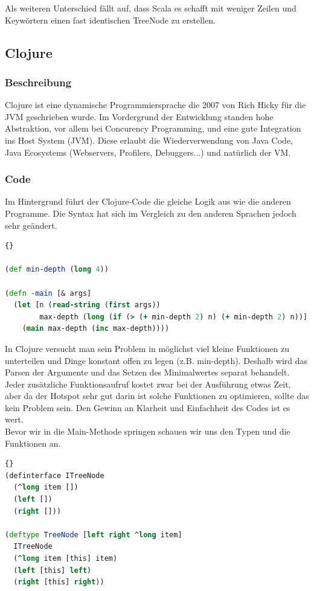 \documentclass{fancydocument}
\begin{document}
Als weiteren Unterschied f\"allt auf, dass Scala es schafft mit weniger
Zeilen und Keywörtern einen fast identischen TreeNode zu
erstellen.

\subsection{Clojure}
\subsubsection{Beschreibung}

Clojure ist eine dynamische Programmiersprache die 2007 von Rich Hicky
für die JVM geschrieben wurde. Im Vordergrund der Entwicklung standen
hohe Abstraktion, vor allem bei Concurency Programming, und eine gute
Integration ins Host System (JVM). Diese erlaubt die Wiederverwendung von
Java Code, Java Ecosystems (Webservers, Profilers, Debuggers...) und natürlich der VM.
\newpage
\subsubsection{Code}
Im Hintergrund f\"uhrt der Clojure-Code die gleiche Logik aus wie die anderen
Programme. Die Syntax hat sich im Vergleich zu den anderen Sprachen jedoch
sehr ge\"andert. 
\begin{lstlisting}[language=Clojure,caption=Simple main]{}

(def min-depth (long 4))

(defn -main [& args]
  (let [n (read-string (first args))
        max-depth (long (if (> (+ min-depth 2) n) (+ min-depth 2) n))]
    (main max-depth (inc max-depth))))
\end{lstlisting}

In Clojure versucht man sein Problem in m\"oglichst viel kleine
Funktionen zu unterteilen und Dinge konstant offen
zu legen (z.B. min-depth). Deshalb wird das Parsen der Argumente und
das Setzen des Minimalwertes separat behandelt. Jeder zus\"atzliche
Funktionsaufruf kostet zwar bei der Ausf\"uhrung etwas Zeit, aber da
der Hotspot sehr gut darin ist solche Funktionen zu optimieren, sollte das
kein Problem sein. Den Gewinn an Klarheit und Einfachheit des Codes
ist es wert.\\
\newline
Bevor wir in die Main-Methode springen schauen wir uns den Typen und
die Funktionen an.

\begin{lstlisting}[language=Clojure,caption=Node and Interface]{}
(definterface ITreeNode
  (^long item [])
  (left [])
  (right []))

(deftype TreeNode [left right ^long item]
  ITreeNode
  (^long item [this] item)
  (left [this] left)
  (right [this] right))
\end{lstlisting}
\end{document}
